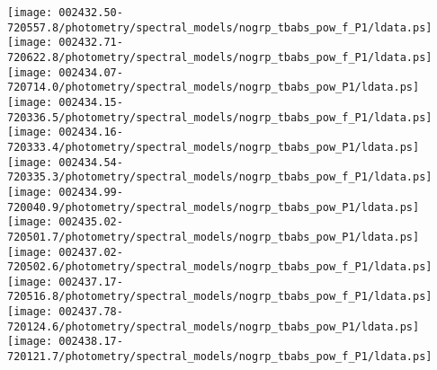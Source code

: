 \documentclass{aastex}
\begin{document}
\begin{figure*}[!ht]
\centering
\texttt{[image: 002432.50-720557.8/photometry/spectral\_models/nogrp\_tbabs\_pow\_f\_P1/ldata.ps]} \hfill 
\texttt{[image: 002432.71-720622.8/photometry/spectral\_models/nogrp\_tbabs\_pow\_f\_P1/ldata.ps]} \hfill 
\texttt{[image: 002434.07-720714.0/photometry/spectral\_models/nogrp\_tbabs\_pow\_P1/ldata.ps]} \\ 
\vspace*{0.5in}
\texttt{[image: 002434.15-720336.5/photometry/spectral\_models/nogrp\_tbabs\_pow\_f\_P1/ldata.ps]} \hfill 
\texttt{[image: 002434.16-720333.4/photometry/spectral\_models/nogrp\_tbabs\_pow\_P1/ldata.ps]} \hfill 
\texttt{[image: 002434.54-720335.3/photometry/spectral\_models/nogrp\_tbabs\_pow\_f\_P1/ldata.ps]} \\ 
\vspace*{0.5in}
\texttt{[image: 002434.99-720040.9/photometry/spectral\_models/nogrp\_tbabs\_pow\_P1/ldata.ps]} \hfill 
\texttt{[image: 002435.02-720501.7/photometry/spectral\_models/nogrp\_tbabs\_pow\_P1/ldata.ps]} \hfill 
\texttt{[image: 002437.02-720502.6/photometry/spectral\_models/nogrp\_tbabs\_pow\_f\_P1/ldata.ps]} \\ 
\vspace*{0.5in}
\texttt{[image: 002437.17-720516.8/photometry/spectral\_models/nogrp\_tbabs\_pow\_f\_P1/ldata.ps]} \hfill 
\texttt{[image: 002437.78-720124.6/photometry/spectral\_models/nogrp\_tbabs\_pow\_P1/ldata.ps]} \hfill 
\texttt{[image: 002438.17-720121.7/photometry/spectral\_models/nogrp\_tbabs\_pow\_f\_P1/ldata.ps]} \\ 
\vspace*{0.5in}
\end{figure*}
\clearpage
\end{document}
